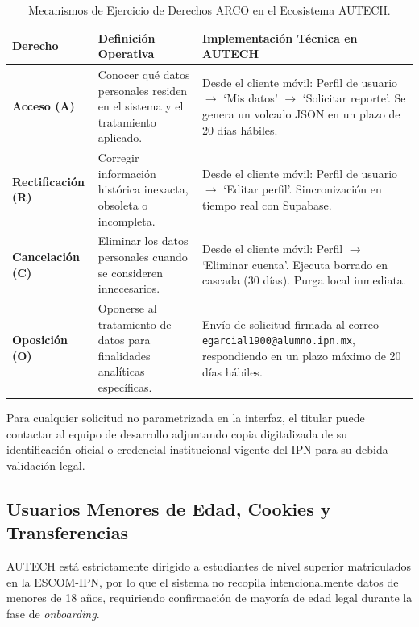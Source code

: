 \begin{table}[htbp]
    \centering
    \small
    \caption{Mecanismos de Ejercicio de Derechos ARCO en el Ecosistema AUTECH.}
    \label{tab:derechos_arco}
    \begin{tabular}{l p{5.5cm} p{6.0cm}}
        \toprule
        \textbf{Derecho} & \textbf{Definición Operativa} & \textbf{Implementación Técnica en AUTECH} \\
        \midrule
        \textbf{Acceso (A)} & Conocer qué datos personales residen en el sistema y el tratamiento aplicado. & Desde el cliente móvil: Perfil de usuario $\rightarrow$ `Mis datos' $\rightarrow$ `Solicitar reporte'. Se genera un volcado JSON en un plazo de 20 días hábiles. \\
        \addlinespace
        \textbf{Rectificación (R)} & Corregir información histórica inexacta, obsoleta o incompleta. & Desde el cliente móvil: Perfil de usuario $\rightarrow$ `Editar perfil'. Sincronización en tiempo real con Supabase. \\
        \addlinespace
        \textbf{Cancelación (C)} & Eliminar los datos personales cuando se consideren innecesarios. & Desde el cliente móvil: Perfil $\rightarrow$ `Eliminar cuenta'. Ejecuta borrado en cascada (30 días). Purga local inmediata. \\
        \addlinespace
        \textbf{Oposición (O)} & Oponerse al tratamiento de datos para finalidades analíticas específicas. & Envío de solicitud firmada al correo \texttt{egarcial1900@alumno.ipn.mx}, respondiendo en un plazo máximo de 20 días hábiles. \\
        \bottomrule
    \end{tabular}
\end{table}

Para cualquier solicitud no parametrizada en la interfaz, el titular puede contactar al equipo de desarrollo adjuntando copia digitalizada de su identificación oficial o credencial institucional vigente del IPN para su debida validación legal.

\subsection{Usuarios Menores de Edad, Cookies y Transferencias}
\label{subsec:privacidad_clausulas_adicionales}

AUTECH está estrictamente dirigido a estudiantes de nivel superior matriculados en la ESCOM-IPN, por lo que el sistema no recopila intencionalmente datos de menores de 18 años, requiriendo confirmación de mayoría de edad legal durante la fase de \textit{onboarding}. 

